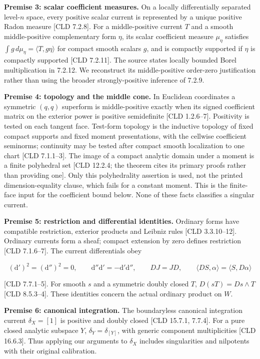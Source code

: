 \documentclass[
  11pt,
]{article}
\begin{document}
\textbf{Premise 3: scalar coefficient measures.} On a locally
differentially separated level-\(n\) space, every positive scalar
current is represented by a unique positive Radon measure {[}CLD
7.2.8{]}. For a middle-positive current \(T\) and a smooth
middle-positive complementary form \(\eta\), its scalar coefficient
measure \(\mu_\eta\) satisfies
\(\int g\,d\mu_\eta=\langle T,g\eta\rangle\) for compact smooth scalars
\(g\), and is compactly supported if \(\eta\) is compactly supported
{[}CLD 7.2.11{]}. The source states locally bounded Borel multiplication
in 7.2.12. We reconstruct its middle-positive order-zero justification
rather than using the broader strongly-positive inference of 7.2.9.

\textbf{Premise 4: topology and the middle cone.} In Euclidean
coordinates a symmetric \((q,q)\) superform is middle-positive exactly
when its signed coefficient matrix on the exterior power is positive
semidefinite {[}CLD 1.2.6--7{]}. Positivity is tested on each tangent
face. Test-form topology is the inductive topology of fixed compact
supports and fixed moment presentations, with the cellwise coefficient
seminorms; continuity may be tested after compact smooth localization to
one chart {[}CLD 7.1.1--3{]}. The image of a compact analytic domain
under a moment is a finite polyhedral set {[}CLD 12.2.4; the theorem
cites its primary proofs rather than providing one{]}. Only this
polyhedrality assertion is used, not the printed dimension-equality
clause, which fails for a constant moment. This is the finite-face input
for the coefficient bound below. None of these facts classifies a
singular current.

\textbf{Premise 5: restriction and differential identities.} Ordinary
forms have compatible restriction, exterior products and Leibniz rules
{[}CLD 3.3.10--12{]}. Ordinary currents form a sheaf; compact extension
by zero defines restriction {[}CLD 7.1.6--7{]}. The current
differentials obey

\[ (\mathrm d')^2=(\mathrm d'')^2=0,\qquad
\mathrm d''\mathrm d'=-\mathrm d'\mathrm d'',\qquad DJ=JD,\qquad
\langle DS,\alpha\rangle=\langle S,D\alpha\rangle \]

{[}CLD 7.7.1--5{]}. For smooth \(s\) and a symmetric doubly closed
\(T\), \(D(sT)=Ds\wedge T\) {[}CLD 8.5.3--4{]}. These identities concern
the actual ordinary product on \(W\).

\textbf{Premise 6: canonical integration.} The boundaryless canonical
integration current \(\delta_X=[1]\) is positive and doubly closed
{[}CLD 15.7.1, 7.7.4{]}. For a pure closed analytic subspace \(Y\),
\(\delta_Y=\delta_{[Y]}\), with generic component multiplicities {[}CLD
16.6.3{]}. Thus applying our arguments to \(\delta_X\) includes
singularities and nilpotents with their original calibration.
\end{document}
